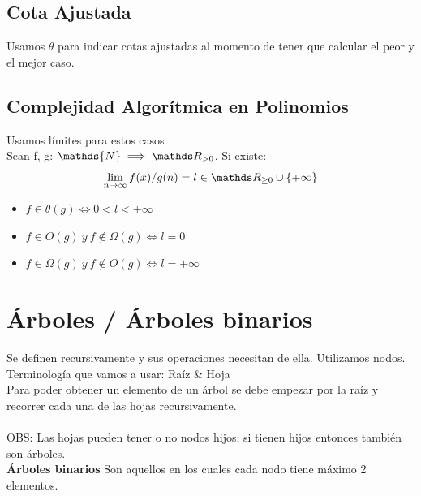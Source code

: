 \documentclass[10pt,a4paper]{article}
\begin{document}
\subsection*{Cota Ajustada}
Usamos \(\theta\) para indicar cotas ajustadas al momento de tener que calcular el peor y el mejor caso.
\subsection*{Complejidad Algorítmica en Polinomios}
Usamos límites para estos casos \\

Sean f, g: \(\mathds{N} \implies \float_{>0}\). Si existe:
\[ \lim_{n\to\infty} f(x)/g(n) = l \in \float_{\ge 0} \cup \{ +\infty \} \]
\begin{itemize}
    \item \(f \in \theta(g) \iff 0<l<+\infty\)
    \item \(f \in O(g) \ y \ f \notin \Omega(g) \iff l = 0\)
    \item \(f \in \Omega(g) \ y \ f \notin O(g) \iff l = +\infty\)
\end{itemize}
\section*{Árboles / Árboles binarios}
Se definen recursivamente y sus operaciones necesitan de ella. Utilizamos nodos. \\
Terminología que vamos a usar: Raíz \& Hoja \\ 
Para poder obtener un elemento de un árbol se debe empezar por la raíz y recorrer cada una de las hojas recursivamente. \\ \\
OBS: Las hojas pueden tener o no nodos hijos; si tienen hijos entonces también son árboles.  \\ 
\textbf{Árboles binarios}
Son aquellos en los cuales cada nodo tiene máximo 2 elementos.
\end{document}

